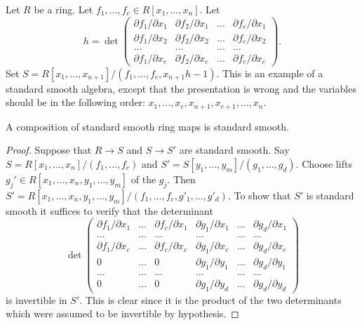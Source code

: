 \begin{example}
\label{example-make-standard-smooth}
Let $R$ be a ring.
Let $f_1, \ldots, f_c \in R[x_1, \ldots, x_n]$.
Let
$$
h =
\det 
\left(
\begin{matrix}
\partial f_1/\partial x_1 & 
\partial f_2/\partial x_1 & 
\ldots &
\partial f_c/\partial x_1 \\
\partial f_1/\partial x_2 & 
\partial f_2/\partial x_2 & 
\ldots &
\partial f_c/\partial x_2 \\
\ldots & \ldots & \ldots & \ldots \\
\partial f_1/\partial x_c & 
\partial f_2/\partial x_c & 
\ldots &
\partial f_c/\partial x_c
\end{matrix}
\right).
$$
Set $S = R[x_1, \ldots, x_{n + 1}]/(f_1, \ldots, f_c, x_{n + 1}h - 1)$.
This is an example of a standard smooth algebra, except that the
presentation is wrong and the variables should be in the
following order:
$x_1, \ldots, x_c, x_{n + 1}, x_{c + 1}, \ldots, x_n$.
\end{example}

\begin{lemma}
\label{lemma-compose-standard-smooth}
A composition of standard smooth ring maps is standard smooth.
\end{lemma}

\begin{proof}
Suppose that $R \to S$ and $S \to S'$ are standard smooth. Say
$S =  R[x_1, \ldots, x_n]/(f_1, \ldots, f_c)$
and
$S' = S[y_1, \ldots, y_m]/(g_1, \ldots, g_d)$.
Choose lifts $g_j' \in R[x_1, \ldots, x_n, y_1, \ldots, y_m]$ of the $g_j$.
Then
$S' = R[x_1, \ldots, x_n, y_1, \ldots, y_m]/
(f_1, \ldots, f_c, g'_1, \ldots, g'_d)$.
To show that $S'$ is standard smooth it suffices to verify
that the determinant
$$
\det 
\left(
\begin{matrix}
\partial f_1/\partial x_1 & 
\ldots &
\partial f_c/\partial x_1 &
\partial g_1/\partial x_1 & 
\ldots &
\partial g_d/\partial x_1 \\
\ldots &
\ldots &
\ldots &
\ldots &
\ldots &
\ldots  \\
\partial f_1/\partial x_c & 
\ldots &
\partial f_c/\partial x_c &
\partial g_1/\partial x_c & 
\ldots &
\partial g_d/\partial x_c \\
0 & 
\ldots &
0 &
\partial g_1/\partial y_1 & 
\ldots &
\partial g_d/\partial y_1 \\
\ldots &
\ldots &
\ldots &
\ldots &
\ldots &
\ldots  \\
0 & 
\ldots &
0 &
\partial g_1/\partial y_d & 
\ldots &
\partial g_d/\partial y_d
\end{matrix}
\right)
$$
is invertible in $S'$. This is clear since it is the product
of the two determinants which were assumed to be invertible
by hypothesis.
\end{proof}

